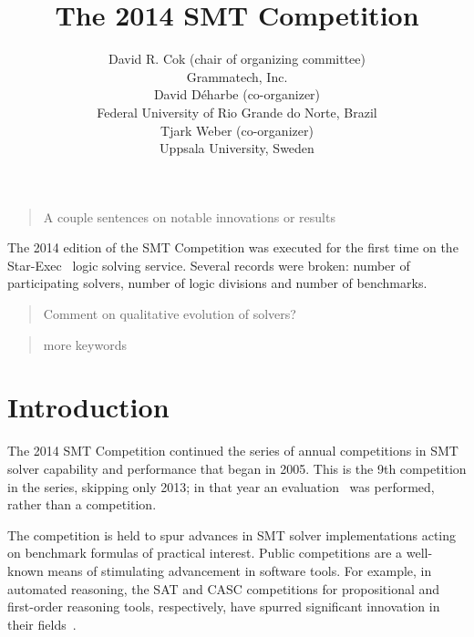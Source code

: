 \documentclass[twosize,11pt]{article}
\newcommand{\comment}[2]{\begin{quote}\sc #1\marginpar{\textcolor{red}{$\ast^{\mbox{#2}}$}}\end{quote}}
\newcommand{\tjark}[1]{\comment{#1}{TW}}
\newcommand{\davidd}[1]{\comment{#1}{DD}}
\newcommand{\tjarkx}[1]{\tjark{#1}}
\begin{document}
\title{The 2014 SMT Competition}

\author{
\name David R. Cok (chair of organizing committee)
 \\
\addr Grammatech, Inc. \\
\AND
\name David D\'{e}harbe (co-organizer)
 \\
\addr Federal University of Rio Grande do Norte, Brazil \\ 
\AND
\name Tjark Weber (co-organizer) \\
\addr Uppsala University, Sweden
}

\maketitle

\tjarkx{A couple sentences on notable innovations or results}
The 2014 edition of the SMT Competition was executed for the first time on the Star-Exec~\cite{DBLP:conf/cade/StumpST14} logic solving service. Several records were broken: number of participating solvers, number of logic divisions and number of benchmarks.

\davidd{Comment on qualitative evolution of solvers?}
 \tjarkx{more keywords}


\section{Introduction}
\label{sec:intro}

The 2014 SMT Competition continued the series of annual competitions in SMT solver capability and performance that began in 2005. This is the 9th competition in the series, skipping only 2013; in that year an evaluation~\cite{it:2014-017} was performed, rather than a competition.

The competition is held to spur advances in
SMT solver implementations acting on benchmark formulas of practical interest. Public competitions are
a well-known means of stimulating advancement in software tools. For example, in automated
reasoning, the SAT and CASC competitions for propositional and first-order reasoning tools, respectively,
have spurred significant innovation in their fields~\cite{leberre+03,PSS02}.
\end{document}
